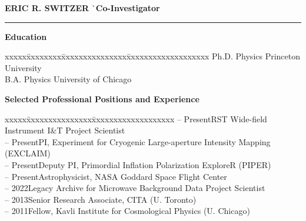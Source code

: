 \documentclass[12pt]{article}
\begin{document}
\vspace{-3mm}
\noindent
\begin{tabbing}
{\bf ERIC R. SWITZER} \` \small{{\bf Co-Investigator}} \\
\end{tabbing}
\vspace{-7mm}
\hrule height 0.7pt

\vspace{5mm}
\addressminimal{\lastupdated}

\small{
\noindent
{\bf Education}
\vspace{-3mm}
\begin{tabbing}
xxxxx\=xxxxxxxx\=xxxxxxxxxxxxxxx\=xxxxxxxxxxxxxxxxxxx\kill
{} \> Ph.D. Physics \> Princeton University \\
 \> B.A. Physics \> University of Chicago \\
\end{tabbing}}

\vspace{-5mm}
\small{
\noindent
{\bf Selected Professional Positions and Experience}
\vspace{-3mm}
\begin{tabbing}
xxxxx\=xxxxxxxxxxxxxxx\=xxxxxxxxxxxxxxxxxxx\kill
{} -- Present\>RST Wide-field Instrument I\&T Project Scientist \\
 -- Present\>PI, Experiment for Cryogenic Large-aperture Intensity Mapping (EXCLAIM) \\
 -- Present\>Deputy PI, Primordial Inflation Polarization ExploreR (PIPER) \\
 -- Present\>Astrophysicist, NASA Goddard Space Flight Center \\
 -- 2022\>Legacy Archive for Microwave Background Data Project Scientist \\
 -- 2013\>Senior Research Associate, CITA (U. Toronto) \\
 -- 2011\>Fellow, Kavli Institute for Cosmological Physics (U. Chicago) \\
\end{tabbing}}
\end{document}
